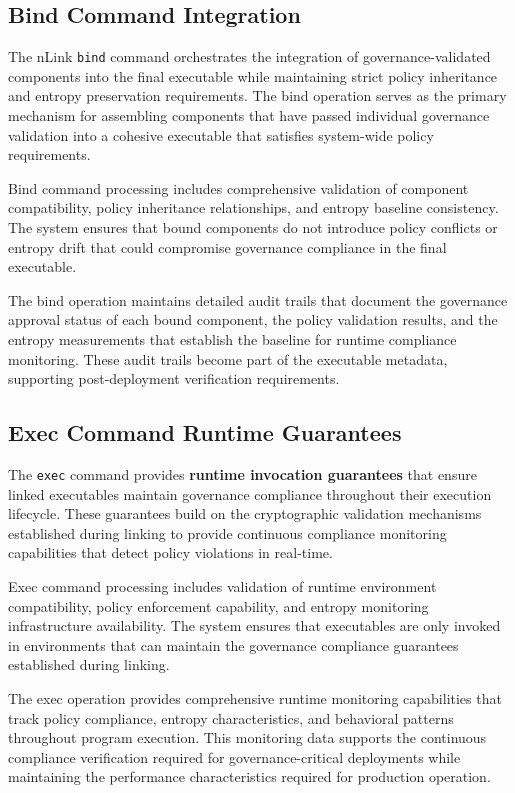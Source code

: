 \subsection{Bind Command Integration}

The nLink \texttt{bind} command orchestrates the integration of governance-validated components into the final executable while maintaining strict policy inheritance and entropy preservation requirements. The bind operation serves as the primary mechanism for assembling components that have passed individual governance validation into a cohesive executable that satisfies system-wide policy requirements.

Bind command processing includes comprehensive validation of component compatibility, policy inheritance relationships, and entropy baseline consistency. The system ensures that bound components do not introduce policy conflicts or entropy drift that could compromise governance compliance in the final executable.

The bind operation maintains detailed audit trails that document the governance approval status of each bound component, the policy validation results, and the entropy measurements that establish the baseline for runtime compliance monitoring. These audit trails become part of the executable metadata, supporting post-deployment verification requirements.

\subsection{Exec Command Runtime Guarantees}

The \texttt{exec} command provides \textbf{runtime invocation guarantees} that ensure linked executables maintain governance compliance throughout their execution lifecycle. These guarantees build on the cryptographic validation mechanisms established during linking to provide continuous compliance monitoring capabilities that detect policy violations in real-time.

Exec command processing includes validation of runtime environment compatibility, policy enforcement capability, and entropy monitoring infrastructure availability. The system ensures that executables are only invoked in environments that can maintain the governance compliance guarantees established during linking.

The exec operation provides comprehensive runtime monitoring capabilities that track policy compliance, entropy characteristics, and behavioral patterns throughout program execution. This monitoring data supports the continuous compliance verification required for governance-critical deployments while maintaining the performance characteristics required for production operation.

